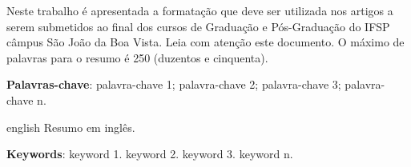 \documentclass[
	article,
	11pt,
	oneside,
	a4paper,
	chapter=TITLE,
	section=TITLE,
	english,
	brazil,
	sumario=tradicional
]{abntex2}
\begin{document}
	
	
	\frenchspacing 
	
	
    
	\maketitle
    
	\begin{resumoumacoluna}
		
		Neste trabalho é apresentada a formatação que deve ser utilizada nos artigos a serem submetidos ao final dos cursos de Graduação e Pós-Graduação do IFSP câmpus São João da Boa Vista. Leia com atenção este documento. O máximo de palavras para o resumo é 250 (duzentos e cinquenta). 
		
		\vspace{\onelineskip}
		
        \textbf{Palavras-chave}: palavra-chave 1; palavra-chave 2; palavra-chave 3; palavra-chave n.
		
	\end{resumoumacoluna}
	
    \renewcommand{\resumoname}{Abstract}
    \begin{resumoumacoluna}
    	
        \begin{otherlanguage*}{english}
   	    	Resumo em inglês.
   		
       		\vspace{\onelineskip}
   		
   	    	\noindent
   	    	\textbf{Keywords}: keyword 1. keyword 2. keyword 3. keyword n.
   		   
      \end{otherlanguage*} 
  
   	\end{resumoumacoluna}
        
	
\end{document}
